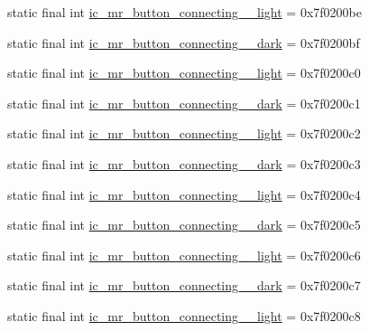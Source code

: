 \begin{CompactItemize}
\item 
static final int \hyperlink{classandroid_1_1support_1_1v7_1_1recyclerview_1_1_r_1_1drawable_1fe4561f3fa6d0d2feb3d4664c9dd353}{ic\_\-mr\_\-button\_\-connecting\_\_\-light} = 0x7f0200be
\item 
static final int \hyperlink{classandroid_1_1support_1_1v7_1_1recyclerview_1_1_r_1_1drawable_d2a99c790a2ef35fe8d35ebe9ac8c2e8}{ic\_\-mr\_\-button\_\-connecting\_\_\-dark} = 0x7f0200bf
\item 
static final int \hyperlink{classandroid_1_1support_1_1v7_1_1recyclerview_1_1_r_1_1drawable_6bc7d999f2cc74c7b65d5e1c1385e5cc}{ic\_\-mr\_\-button\_\-connecting\_\_\-light} = 0x7f0200c0
\item 
static final int \hyperlink{classandroid_1_1support_1_1v7_1_1recyclerview_1_1_r_1_1drawable_51b27424c38ec1b12320eeb7f39527a3}{ic\_\-mr\_\-button\_\-connecting\_\_\-dark} = 0x7f0200c1
\item 
static final int \hyperlink{classandroid_1_1support_1_1v7_1_1recyclerview_1_1_r_1_1drawable_ab3f1aa0a1655a995401d59f9e28bff2}{ic\_\-mr\_\-button\_\-connecting\_\_\-light} = 0x7f0200c2
\item 
static final int \hyperlink{classandroid_1_1support_1_1v7_1_1recyclerview_1_1_r_1_1drawable_a7fe829528e7fe8d0f515f88e671bfb2}{ic\_\-mr\_\-button\_\-connecting\_\_\-dark} = 0x7f0200c3
\item 
static final int \hyperlink{classandroid_1_1support_1_1v7_1_1recyclerview_1_1_r_1_1drawable_e84303e2a307693808aae25ca63c3532}{ic\_\-mr\_\-button\_\-connecting\_\_\-light} = 0x7f0200c4
\item 
static final int \hyperlink{classandroid_1_1support_1_1v7_1_1recyclerview_1_1_r_1_1drawable_d24a5029eb61d972dfbb0b616ee74373}{ic\_\-mr\_\-button\_\-connecting\_\_\-dark} = 0x7f0200c5
\item 
static final int \hyperlink{classandroid_1_1support_1_1v7_1_1recyclerview_1_1_r_1_1drawable_7ce6a4c8500be2e9745c3dd20193cb2f}{ic\_\-mr\_\-button\_\-connecting\_\_\-light} = 0x7f0200c6
\item 
static final int \hyperlink{classandroid_1_1support_1_1v7_1_1recyclerview_1_1_r_1_1drawable_3baaf1543e2c95ca63297fb7eb5535e7}{ic\_\-mr\_\-button\_\-connecting\_\_\-dark} = 0x7f0200c7
\item 
static final int \hyperlink{classandroid_1_1support_1_1v7_1_1recyclerview_1_1_r_1_1drawable_daa70079256ca025b84397a499a066ee}{ic\_\-mr\_\-button\_\-connecting\_\_\-light} = 0x7f0200c8
\item 

\end{CompactItemize}
